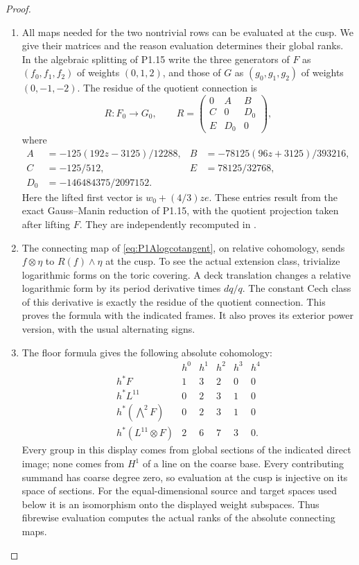 \documentclass[11pt,a4paper]{article}
\theoremstyle{definition}
\newcommand{\C}{\mathbb C}\newcommand{\R}{\mathbb R}\newcommand{\Z}{\mathbb Z}\newcommand{\Q}{\mathbb Q}\newcommand{\N}{\mathbb N}\newcommand{\F}{\mathbb F}
\begin{document}
\begin{proof}
\begin{enumerate}[label=\arabic*.]
\item All maps needed for the two nontrivial rows can be evaluated at
the cusp. We give their matrices and the reason evaluation
determines their global ranks. In the algebraic splitting of
P1.15 write the three generators of $F$ as $(f_0,f_1,f_2)$ of
weights $(0,1,2)$, and those of $G$ as $(g_0,g_1,g_2)$ of
weights $(0,-1,-2)$. The residue of the quotient connection is
\[
R:F_0\longrightarrow G_0,\qquad
R=\begin{pmatrix}0&A&B\\C&0&D_0\\E&D_0&0\end{pmatrix},
\]
where
\begin{align*}
A&=-125(192z-3125)/12288,&
B&=-78125(96z+3125)/393216,\\
C&=-125/512,&E&=78125/32768,\\
D_0&=-146484375/2097152.
\end{align*}
Here the lifted first vector is $w_0+(4/3)ze$.
These entries result from the exact Gauss--Manin reduction of
P1.15, with the quotient projection taken after lifting $F$.
They are independently recomputed in
.

\item The connecting map of \eqref{eq:P1Alogcotangent}, on relative
cohomology, sends $f\otimes\eta$ to $R(f)\wedge\eta$ at the
cusp. To see the actual extension class, trivialize logarithmic
forms on the toric covering. A deck translation changes a
relative logarithmic form by its period derivative times
$dq/q$. The constant Cech class of this derivative is exactly
the residue of the quotient connection. This proves the
formula with the indicated frames. It also proves its exterior
power version, with the usual alternating signs.

\item The floor formula gives the following absolute cohomology:
\[
\begin{array}{c|ccccc}
&h^0&h^1&h^2&h^3&h^4\\\hline
h^*F&1&3&2&0&0\\
h^*L^{11}&0&2&3&1&0\\
h^*(\bigwedge^2F)&0&2&3&1&0\\
h^*(L^{11}\otimes F)&2&6&7&3&0.
\end{array}
\]
Every group in this display comes from global sections of the
indicated direct image; none comes from $H^1$ of a line on the
coarse base. Every contributing summand has coarse degree zero,
so evaluation at the cusp is injective on its space of sections.
For the equal-dimensional source and target spaces used below
it is an isomorphism onto the displayed weight subspaces.
Thus fibrewise evaluation computes the actual ranks of the
absolute connecting maps.


\end{enumerate}
\end{proof}
\end{document}
